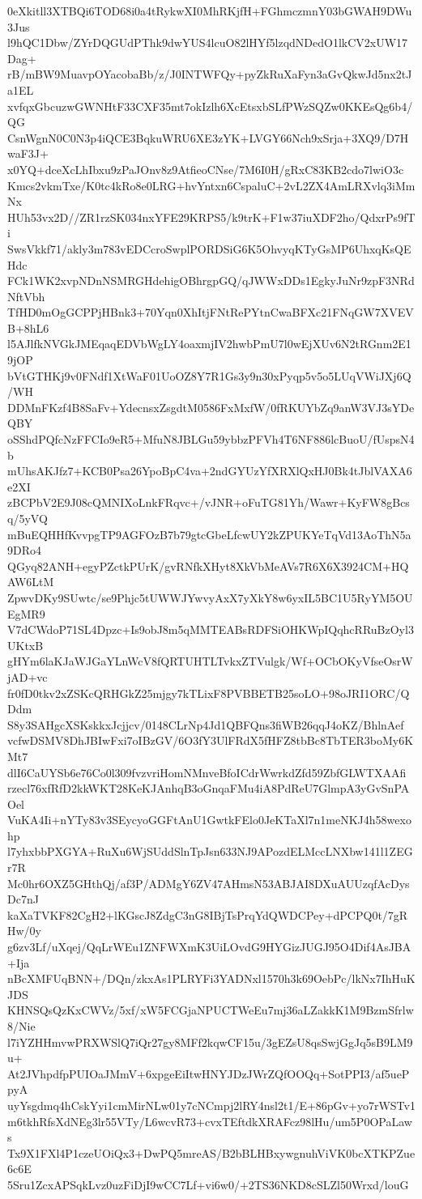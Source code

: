 0eXkitll3XTBQi6TOD68i0a4tRykwXI0MhRKjfH+FGhmczmnY03bGWAH9DWu3Jus
l9hQC1Dbw/ZYrDQGUdPThk9dwYUS4lcuO82lHYf5lzqdNDedO1lkCV2xUW17Dag+
rB/mBW9MuavpOYacobaBb/z/J0INTWFQy+pyZkRuXaFyn3aGvQkwJd5nx2tJa1EL
xvfqxGbcuzwGWNHtF33CXF35mt7okIzlh6XcEtsxbSLfPWzSQZw0KKEsQg6b4/QG
CsnWgnN0C0N3p4iQCE3BqkuWRU6XE3zYK+LVGY66Nch9xSrja+3XQ9/D7HwaF3J+
x0YQ+dceXcLhIbxu9zPaJOnv8z9AtfieoCNse/7M6I0H/gRxC83KB2cdo7lwiO3c
Kmcs2vkmTxe/K0tc4kRo8e0LRG+hvYntxn6CspaluC+2vL2ZX4AmLRXvlq3iMmNx
HUh53vx2D//ZR1rzSK034nxYFE29KRPS5/k9trK+F1w37iuXDF2ho/QdxrPs9fTi
SwsVkkf71/akly3m783vEDCcroSwplPORDSiG6K5OhvyqKTyGsMP6UhxqKsQEHdc
FCk1WK2xvpNDnNSMRGHdehigOBhrgpGQ/qJWWxDDs1EgkyJuNr9zpF3NRdNftVbh
TfHD0mOgGCPPjHBnk3+70Yqn0XhItjFNtRePYtnCwaBFXc21FNqGW7XVEVB+8hL6
l5AJlfkNVGkJMEqaqEDVbWgLY4oaxmjIV2hwbPmU7l0wEjXUv6N2tRGnm2E19jOP
bVtGTHKj9v0FNdf1XtWaF01UoOZ8Y7R1Gs3y9n30xPyqp5v5o5LUqVWiJXj6Q/WH
DDMnFKzf4B8SaFv+YdecnsxZsgdtM0586FxMxfW/0fRKUYbZq9anW3VJ3sYDeQBY
oSShdPQfcNzFFCIo9eR5+MfuN8JBLGu59ybbzPFVh4T6NF886lcBuoU/fUspsN4b
mUhsAKJfz7+KCB0Psa26YpoBpC4va+2ndGYUzYfXRXlQxHJ0Bk4tJblVAXA6e2XI
zBCPbV2E9J08cQMNIXoLnkFRqvc+/vJNR+oFuTG81Yh/Wawr+KyFW8gBcsq/5yVQ
mBuEQHHfKvvpgTP9AGFOzB7b79gtcGbeLfcwUY2kZPUKYeTqVd13AoThN5a9DRo4
QGyq82ANH+egyPZctkPUrK/gvRNfkXHyt8XkVbMeAVs7R6X6X3924CM+HQAW6LtM
ZpwvDKy9SUwtc/se9Phjc5tUWWJYwvyAxX7yXkY8w6yxIL5BC1U5RyYM5OUEgMR9
V7dCWdoP71SL4Dpzc+Is9obJ8m5qMMTEABsRDFSiOHKWpIQqhcRRuBzOyl3UKtxB
gHYm6laKJaWJGaYLnWcV8fQRTUHTLTvkxZTVulgk/Wf+OCbOKyVfseOsrWjAD+vc
fr0fD0tkv2xZSKcQRHGkZ25mjgy7kTLixF8PVBBETB25soLO+98oJRI1ORC/QDdm
S8y3SAHgcXSKskkxJcjjcv/0148CLrNp4Jd1QBFQns3fiWB26qqJ4oKZ/BhlnAef
vcfwDSMV8DhJBIwFxi7oIBzGV/6O3fY3UlFRdX5fHFZ8tbBc8TbTER3boMy6KMt7
dlI6CaUYSb6e76Co0l309fvzvriHomNMnveBfoICdrWwrkdZfd59ZbfGLWTXAAfi
rzecl76xfRfD2kkWKT28KeKJAnhqB3oGnqaFMu4iA8PdReU7GlmpA3yGvSnPAOel
VuKA4Ii+nYTy83v3SEycyoGGFtAnU1GwtkFElo0JeKTaXl7n1meNKJ4h58wexohp
l7yhxbbPXGYA+RuXu6WjSUddSlnTpJsn633NJ9APozdELMccLNXbw141l1ZEGr7R
Mc0hr6OXZ5GHthQj/af3P/ADMgY6ZV47AHmsN53ABJAI8DXuAUUzqfAcDysDc7nJ
kaXaTVKF82CgH2+lKGscJ8ZdgC3nG8IBjTsPrqYdQWDCPey+dPCPQ0t/7gRHw/0y
g6zv3Lf/uXqej/QqLrWEu1ZNFWXmK3UiLOvdG9HYGizJUGJ95O4Dif4AsJBA+Ija
nBcXMFUqBNN+/DQn/zkxAs1PLRYFi3YADNxl1570h3k69OebPc/lkNx7IhHuKJDS
KHNSQsQzKxCWVz/5xf/xW5FCGjaNPUCTWeEu7mj36aLZakkK1M9BzmSfrlw8/Nie
l7iYZHHmvwPRXWSlQ7iQr27gy8MFf2kqwCF15u/3gEZsU8qsSwjGgJq5sB9LM9u+
At2JVhpdfpPUIOaJMmV+6xpgeEiItwHNYJDzJWrZQfOOQq+SotPPI3/af5uePpyA
uyYsgdmq4hCskYyi1cmMirNLw01y7cNCmpj2lRY4nsl2t1/E+86pGv+yo7rWSTv1
m6tkhRfsXdNEg3lr55VTy/L6wcvR73+cvxTEftdkXRAFcz98lHu/um5P0OPaLaws
Tx9X1FXl4P1czeUOiQx3+DwPQ5mreAS/B2bBLHBxywgnuhViVK0bcXTKPZue6c6E
5Sru1ZcxAPSqkLvz0uzFiDjI9wCC7Lf+vi6w0/+2TS36NKD8cSLZl50Wrxd/louG

